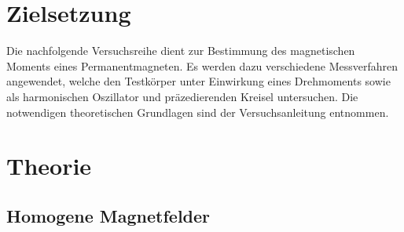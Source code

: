 \section{Zielsetzung}

Die nachfolgende Versuchsreihe dient zur Bestimmung des magnetischen Moments eines Permanentmagneten. Es werden
dazu verschiedene Messverfahren angewendet, welche den Testkörper unter Einwirkung eines Drehmoments sowie als
harmonischen Oszillator und präzedierenden Kreisel untersuchen. Die notwendigen theoretischen Grundlagen sind
der Versuchsanleitung \cite{magnetisch} entnommen.

\section{Theorie}
\label{sec:theorie}

\subsection{Homogene Magnetfelder}

